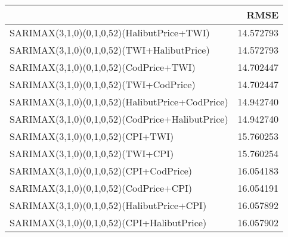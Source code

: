 \begin{tabular}{lr}
\toprule
 & RMSE \\
\midrule
SARIMAX(3,1,0)(0,1,0,52)(HalibutPrice+TWI) & 14.572793 \\
SARIMAX(3,1,0)(0,1,0,52)(TWI+HalibutPrice) & 14.572793 \\
SARIMAX(3,1,0)(0,1,0,52)(CodPrice+TWI) & 14.702447 \\
SARIMAX(3,1,0)(0,1,0,52)(TWI+CodPrice) & 14.702447 \\
SARIMAX(3,1,0)(0,1,0,52)(HalibutPrice+CodPrice) & 14.942740 \\
SARIMAX(3,1,0)(0,1,0,52)(CodPrice+HalibutPrice) & 14.942740 \\
SARIMAX(3,1,0)(0,1,0,52)(CPI+TWI) & 15.760253 \\
SARIMAX(3,1,0)(0,1,0,52)(TWI+CPI) & 15.760254 \\
SARIMAX(3,1,0)(0,1,0,52)(CPI+CodPrice) & 16.054183 \\
SARIMAX(3,1,0)(0,1,0,52)(CodPrice+CPI) & 16.054191 \\
SARIMAX(3,1,0)(0,1,0,52)(HalibutPrice+CPI) & 16.057892 \\
SARIMAX(3,1,0)(0,1,0,52)(CPI+HalibutPrice) & 16.057902 \\
\bottomrule
\end{tabular}
